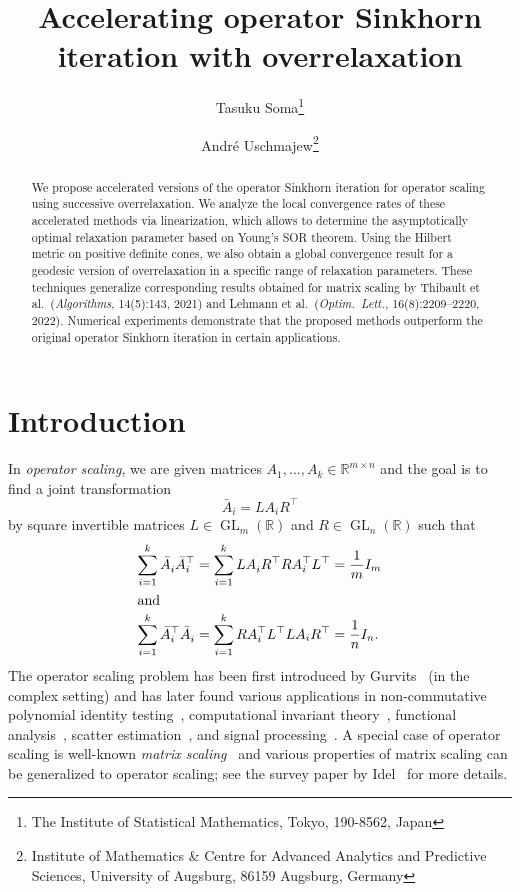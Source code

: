 \documentclass[a4paper]{article}
\title{Accelerating operator Sinkhorn iteration with overrelaxation}
\author{Tasuku Soma\thanks{The Institute of Statistical Mathematics, Tokyo, 190-8562, Japan} \and Andr\'e Uschmajew\thanks{Institute of Mathematics \& Centre for Advanced Analytics and Predictive Sciences, University of Augsburg, 86159 Augsburg, Germany}}
\date{}
\newcommand{\R}{\mathbb{R}}
\DeclareMathOperator{\GL}{GL}
\theoremstyle{definition}
\numberwithin{equation}{section}
\begin{document}
\maketitle
\begin{abstract}
We propose accelerated versions of the operator Sinkhorn iteration for operator scaling using successive overrelaxation. We analyze the local convergence rates of these accelerated methods via linearization, which allows to determine the asymptotically optimal relaxation parameter based on Young's SOR theorem. Using the Hilbert metric on positive definite cones, we also obtain a global convergence result for a geodesic version of overrelaxation in a specific range of relaxation parameters. These techniques generalize corresponding results obtained for matrix scaling by Thibault et al.~(\textit{Algorithms}, 14(5):143, 2021) and Lehmann et al.~(\textit{Optim.~Lett.}, 16(8):2209–2220, 2022). Numerical experiments demonstrate that the proposed methods outperform the original operator Sinkhorn iteration in certain applications. 
\end{abstract}

\section{Introduction}

In \emph{operator scaling}, we are given matrices $A_1, \dots, A_k \in \R^{m \times n}$ and the goal is to find a joint transformation
\[
 \bar A_i = L A_i R^\top
\]
by square invertible matrices $L \in \GL_m(\R)$ and $R \in \GL_n(\R)$ such that
\begin{align}
 \sum_{i=1}^k \bar A_i^{} \bar A_i^\top  &= \sum_{i=1}^k  L A_i^{} R^\top R  A_i^\top L^\top =  \frac{1}{m}I_m \label{eq: OSa} \\
 \intertext{and}
 \sum_{i=1}^k \bar A_i^\top \bar A_i^{} &= \sum_{i=1}^k R A_i^\top L^\top L A_i R^\top = \frac{1}{n}I_n. \label{eq: OSb}
\end{align}
The operator scaling problem has been first introduced by Gurvits~\cite{Gurvits2004} (in the complex setting) and has later found various applications in non-commutative polynomial identity testing~\cite{Garg2019}, computational invariant theory~\cite{Allen-Zhu2018}, functional analysis~\cite{Garg2018,Sra2018}, scatter estimation~\cite{Franks2020,Drton2021}, and signal processing~\cite{Barthe1998,Kwok2018}. A special case of operator scaling is well-known \emph{matrix scaling}~\cite{Sinkhorn1967} and various properties of matrix scaling can be generalized to operator scaling; see the survey paper by Idel~\cite{Idel2016} for more details.
\end{document}
